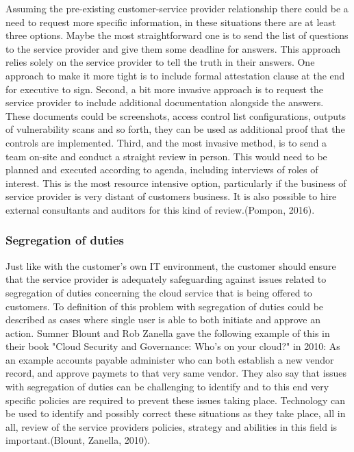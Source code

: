 \documentclass{article}
\begin{document}
Assuming the pre-existing customer-service provider relationship there could be a need to request more specific information, in these situations there are at least three options. Maybe the most straightforward one is to send the list of questions to the service provider and give them some deadline for answers. This approach relies solely on the service provider to tell the truth in their answers. One approach to make it more tight is to include formal attestation clause at the end for executive to sign. Second, a bit more invasive approach is to request the service provider to include additional documentation alongside the answers. These documents could be screenshots, access control list configurations, outputs of vulnerability scans and so forth, they can be used as additional proof that the controls are implemented. Third, and the most invasive method, is to send a team on-site and conduct a straight review in person. This would need to be planned and executed according to agenda, including interviews of roles of interest. This is the most resource intensive option, particularly if the business of service provider is very distant of customers business. It is also possible to hire external consultants and auditors for this kind of review.(Pompon, 2016). 
\subsubsection{Segregation of duties}
Just like with the customer's own IT environment, the customer should ensure that the service provider is adequately safeguarding against issues related to segregation of duties concerning the cloud service that is being offered to customers.
To definition of this problem with segregation of duties could be described as cases where single user is able to both initiate and approve an action. Sumner Blount and Rob Zanella gave the following example of this in their book "Cloud Security and Governance: Who's on your cloud?" in 2010: As an example accounts payable administer who can both establish a new vendor record, and approve paymets to that very same vendor. They also say that issues with segregation of duties can be challenging to identify and to this end very specific policies are required to prevent these issues taking place. Technology can be used to identify and possibly correct these situations as they take place, all in all, review of the service providers policies, strategy and abilities in this field is important.(Blount, Zanella, 2010). 
\end{document}
